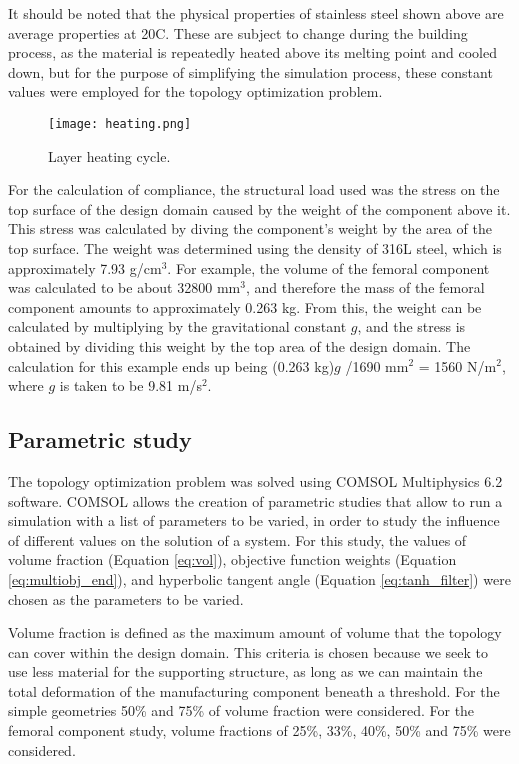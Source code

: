 \documentclass[../main.tex]{subfiles}
\begin{document}
It should be noted that the physical properties of stainless steel shown above are average properties at 20\degree C. These are subject to change during the building process, as the material is repeatedly heated above its melting point and cooled down, but for the purpose of simplifying the simulation process, these constant values were employed for the topology optimization problem. 

\begin{figure}
  \texttt{[image: heating.png]}
  \caption{Layer heating cycle.}
  \label{fig:heating}
\end{figure}

For the calculation of compliance, the structural load used was the stress on the top surface of the design domain caused by the weight of the component above it. This stress was calculated by diving the component's weight by the area of the top surface. The weight was determined using the density of 316L steel, which is approximately 7.93 g/cm$^3$. For example, the volume of the femoral component was calculated to be about 32800 mm$^3$, and therefore the mass of the femoral component amounts to approximately 0.263 kg. From this, the weight can be calculated by multiplying by the gravitational constant $g$, and the stress is obtained by dividing this weight by the top area of the design domain. The calculation for this example ends up being (0.263 kg)$g$ /1690 mm$^2$ = 1560 N/m$^2$, where $g$ is taken to be 9.81 m/s$^2$. 

\subsection{Parametric study}

The topology optimization problem was solved using COMSOL Multiphysics 6.2 software. COMSOL allows the creation of parametric studies that allow to run a simulation with a list of parameters to be varied, in order to study the influence of different values on the solution of a system. For this study, the values of volume fraction (Equation \ref{eq:vol}), objective function weights (Equation \ref{eq:multiobj_end}), and hyperbolic tangent angle (Equation \ref{eq:tanh_filter}) were chosen as the parameters to be varied.

Volume fraction is defined as the maximum amount of volume that the topology can cover within the design domain. This criteria is chosen because we seek to use less material for the supporting structure, as long as we can maintain the total deformation of the manufacturing component beneath a threshold. For the simple geometries 50\% and 75\% of volume fraction were considered. For the femoral component study, volume fractions of 25\%, 33\%, 40\%, 50\% and 75\% were considered. 
\end{document}
